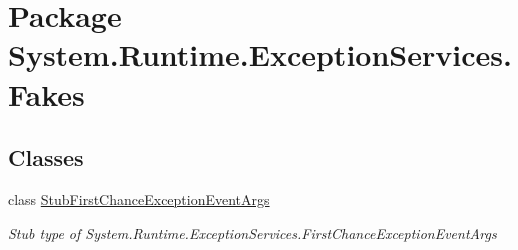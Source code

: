 \hypertarget{namespace_system_1_1_runtime_1_1_exception_services_1_1_fakes}{\section{Package System.\-Runtime.\-Exception\-Services.\-Fakes}
\label{namespace_system_1_1_runtime_1_1_exception_services_1_1_fakes}
}
\subsection*{Classes}
\begin{DoxyCompactItemize}
\item 
class \hyperlink{class_system_1_1_runtime_1_1_exception_services_1_1_fakes_1_1_stub_first_chance_exception_event_args}{Stub\-First\-Chance\-Exception\-Event\-Args}
\begin{DoxyCompactList}\small\item\em Stub type of System.\-Runtime.\-Exception\-Services.\-First\-Chance\-Exception\-Event\-Args\end{DoxyCompactList}\end{DoxyCompactItemize}
